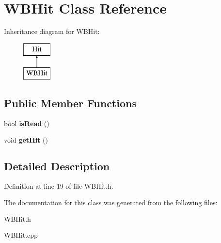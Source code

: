 \hypertarget{class_w_b_hit}{\section{W\+B\+Hit Class Reference}
\label{class_w_b_hit}
}
Inheritance diagram for W\+B\+Hit\+:\begin{figure}[H]
\begin{center}
\leavevmode
\includegraphics[height=2.000000cm]{class_w_b_hit}
\end{center}
\end{figure}
\subsection*{Public Member Functions}
\begin{DoxyCompactItemize}
\item 
\hypertarget{class_w_b_hit_a6b550026649e5d708282c364fa6e1acb}{bool {\bfseries is\+Read} ()}\label{class_w_b_hit_a6b550026649e5d708282c364fa6e1acb}

\item 
\hypertarget{class_w_b_hit_a33c27be52fde0db6ec41ef3f627f8976}{void {\bfseries get\+Hit} ()}\label{class_w_b_hit_a33c27be52fde0db6ec41ef3f627f8976}

\end{DoxyCompactItemize}


\subsection{Detailed Description}


Definition at line 19 of file W\+B\+Hit.\+h.



The documentation for this class was generated from the following files\+:\begin{DoxyCompactItemize}
\item 
W\+B\+Hit.\+h\item 
W\+B\+Hit.\+cpp\end{DoxyCompactItemize}

